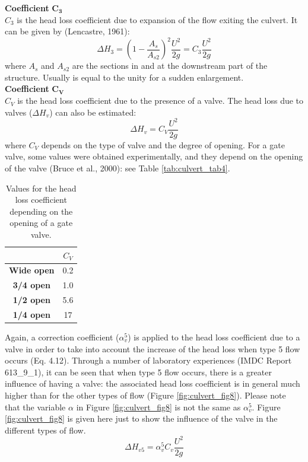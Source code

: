 \textbf{Coefficient} $\mathbf{C_3}$\\
$C_3$ is the head loss coefficient due to expansion of the flow exiting the culvert. 
It can be given by (Lencastre, 1961):
\begin{equation}
\Delta H_3 = \left(1-\dfrac{A_s}{A_{s2}}\right)^2 \dfrac{U^2}{2g} = C_3\dfrac{U^2}{2g}
\end{equation}
where $A_s$ and $A_{s2}$ are the sections in and at the downstream part of the structure. 
Usually is equal to the unity for a sudden enlargement.\\

\textbf{Coefficient} $\mathbf{C_V}$\\
$C_V$ is the head loss coefficient due to the presence of a valve. 
The head loss due to valves ($\Delta H_v$) can also be estimated:
\begin{equation}
\Delta H_v = C_V\dfrac{U^2}{2g}
\end{equation}
where $C_V$ depends on the type of valve and the degree of opening. 
For a gate valve, some values were obtained experimentally, 
and they depend on the opening of the valve (Bruce et al., 2000): 
see Table \ref{tab:culvert_tab4}.
\begin{table}[H]
\caption{Values for the head loss coefficient depending on the opening of a gate valve.}
\label{tab:culvert_tab3}
\begin{center}\begin{tabular}{|c|c|}
\hline
~ & $C_V$ \\
\hline
\textbf{Wide open} & 0.2\\
\hline
\textbf{3/4 open} & 1.0 \\
\hline
\textbf{1/2 open} & 5.6 \\
\hline
\textbf{1/4 open} & 17 \\
\hline
\end{tabular}\end{center}
\end{table}

Again, a correction coefficient ($\alpha_v^5$) is applied to the head loss coefficient 
due to a valve in order to take into account the increase of the head loss when type 5 
flow occurs (Eq. 4.12). 
Through a number of laboratory experiences (IMDC Report 613\_9\_1), it can be seen that when 
type 5 flow occurs, there is a greater influence of having a valve: 
the associated head loss coefficient is in general much higher than for the other types of 
flow (Figure  \ref{fig:culvert_fig8}). 
Please note that the variable $\alpha$ in Figure \ref{fig:culvert_fig8} 
is not the same as $\alpha_v^5$. 
Figure \ref{fig:culvert_fig8} is given here just to show the influence of 
the valve in the different types of flow.
\begin{equation}
\Delta H_{v5} = \alpha_v^5 C_v \dfrac{U^2}{2g}
\end{equation}

